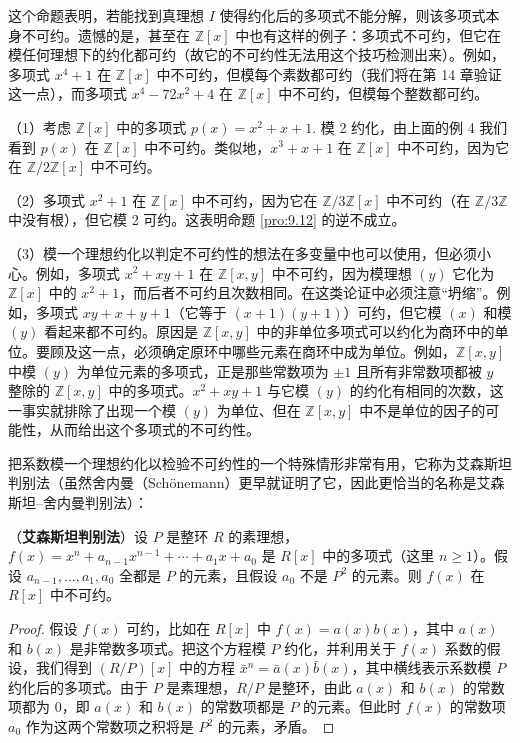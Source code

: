 这个命题表明，若能找到真理想 \(I\) 使得约化后的多项式不能分解，则该多项式本身不可约。遗憾的是，甚至在 \(\mathbb{Z}[x]\) 中也有这样的例子：多项式不可约，但它在模任何理想下的约化都可约（故它的不可约性无法用这个技巧检测出来）。例如，多项式 \(x^4+1\) 在 \(\mathbb{Z}[x]\) 中不可约，但模每个素数都可约（我们将在第 14 章验证这一点），而多项式 \(x^4-72x^2+4\) 在 \(\mathbb{Z}[x]\) 中不可约，但模每个整数都可约。

\begin{example}
（1）考虑 \(\mathbb{Z}[x]\) 中的多项式 \(p(x) = x^2+x+1\). 模 2 约化，由上面的例 4 我们看到 \(p(x)\) 在 \(\mathbb{Z}[x]\) 中不可约。类似地，\(x^3+x+1\) 在 \(\mathbb{Z}[x]\) 中不可约，因为它在 \(\mathbb{Z}/2\mathbb{Z}[x]\) 中不可约。

（2）多项式 \(x^2+1\) 在 \(\mathbb{Z}[x]\) 中不可约，因为它在 \(\mathbb{Z}/3\mathbb{Z}[x]\) 中不可约（在 \(\mathbb{Z}/3\mathbb{Z}\) 中没有根），但它模 2 可约。这表明命题 \ref{pro:9.12} 的逆不成立。

（3）模一个理想约化以判定不可约性的想法在多变量中也可以使用，但必须小心。例如，多项式 \(x^2+xy+1\) 在 \(\mathbb{Z}[x, y]\) 中不可约，因为模理想 \((y)\) 它化为 \(\mathbb{Z}[x]\) 中的 \(x^2+1\)，而后者不可约且次数相同。在这类论证中必须注意“坍缩”。例如，多项式 \(xy+x+y+1\)（它等于 \((x+1)(y+1)\)）可约，但它模 \((x)\) 和模 \((y)\) 看起来都不可约。原因是 \(\mathbb{Z}[x, y]\) 中的非单位多项式可以约化为商环中的单位。要顾及这一点，必须确定原环中哪些元素在商环中成为单位。例如，\(\mathbb{Z}[x, y]\) 中模 \((y)\) 为单位元素的多项式，正是那些常数项为 \(\pm 1\) 且所有非常数项都被 \(y\) 整除的 \(\mathbb{Z}[x, y]\) 中的多项式。\(x^2+xy+1\) 与它模 \((y)\) 的约化有相同的次数，这一事实就排除了出现一个模 \((y)\) 为单位、但在 \(\mathbb{Z}[x, y]\) 中不是单位的因子的可能性，从而给出这个多项式的不可约性。
\end{example}

把系数模一个理想约化以检验不可约性的一个特殊情形非常有用，它称为艾森斯坦判别法（虽然舍内曼（Schönemann）更早就证明了它，因此更恰当的名称是艾森斯坦--舍内曼判别法）：

\begin{proposition}\label{pro:9.13}
（\textbf{艾森斯坦判别法}）设 \(P\) 是整环 \(R\) 的素理想，\(f(x) = x^n + a_{n-1}x^{n-1} + \cdots + a_1x + a_0\) 是 \(R[x]\) 中的多项式（这里 \(n \geq 1\)）。假设 \(a_{n-1}, \ldots, a_1, a_0\) 全都是 \(P\) 的元素，且假设 \(a_0\) 不是 \(P^2\) 的元素。则 \(f(x)\) 在 \(R[x]\) 中不可约。
\end{proposition}

\begin{proof}
假设 \(f(x)\) 可约，比如在 \(R[x]\) 中 \(f(x) = a(x)b(x)\)，其中 \(a(x)\) 和 \(b(x)\) 是非常数多项式。把这个方程模 \(P\) 约化，并利用关于 \(f(x)\) 系数的假设，我们得到 \((R/P)[x]\) 中的方程 \(\bar{x}^n = \bar{a}(x)\bar{b}(x)\)，其中横线表示系数模 \(P\) 约化后的多项式。由于 \(P\) 是素理想，\(R/P\) 是整环，由此 \(a(x)\) 和 \(b(x)\) 的常数项都为 0，即 \(a(x)\) 和 \(b(x)\) 的常数项都是 \(P\) 的元素。但此时 \(f(x)\) 的常数项 \(a_0\) 作为这两个常数项之积将是 \(P^2\) 的元素，矛盾。
\end{proof}

